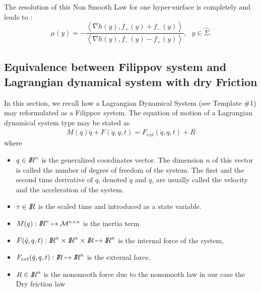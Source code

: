 \documentclass[10pt]{article}
\begin{document}
The resolution of this Non Smooth Law for one hyper-surface is completely and leads to :
\begin{equation}
  \label{eq:5}
\mu(y) = - 
        \frac
        {
        \left< \nabla h(y), f_+(y)+f_-(y)
        \right>
        }
        {
        \left< \nabla h(y), f_-(y)-f_+(y) 
        \right>
        }, \ \ \ y  \in \hat{\Sigma}.
\end{equation}
 

 








\subsection{Equivalence between Filippov system and Lagrangian dynamical system with dry Friction}






In this section,  we recall how a Lagrangian Dynamical System (see Template \#1) may reformulated as a Filippov system. The equation of motion of a Lagrangian dynamical system type may be stated as
\begin{eqnarray}
  \label{eq:1}
  M(q)\ddot q + F(\dot q, q , t) = F_{ext}(\dot q, q, t) + R
\end{eqnarray}
where 
\begin{itemize}
\item $q \in \mbox{\rm $I\!\!R$}^n$ is the generalized coordinates vector. The dimension $n$  of this vector is called  the number of degree of freedom of the system. The first and the second time derivative of $q$, denoted $\dot q$ and $\ddot q$, are usually called the velocity and the acceleration of the system.
\item $\tau \in \mbox{\rm $I\!\!R$}$ is the scaled time and introduced as a state variable.
\item $M(q): \mbox{\rm $I\!\!R$}^n \mapsto \mathcal M^{n\times n}$ is the inertia term 
\item $F(\dot q, q , t) : \RR^n \times \RR^n \times \RR \mapsto \mathcal \RR^{n}$ is the internal force of the system,
\item $F_{ext}(\dot q, q, t):  \mbox{\rm $I\!\!R$} \mapsto \mathcal {\mbox{\rm $I\!\!R$}}^{n}$ is the external force.
\item $R \in \mbox{\rm $I\!\!R$}^n$ is the nonsmooth force due to the nonsmooth law in our case the Dry friction law
\end{itemize}
\end{document}
